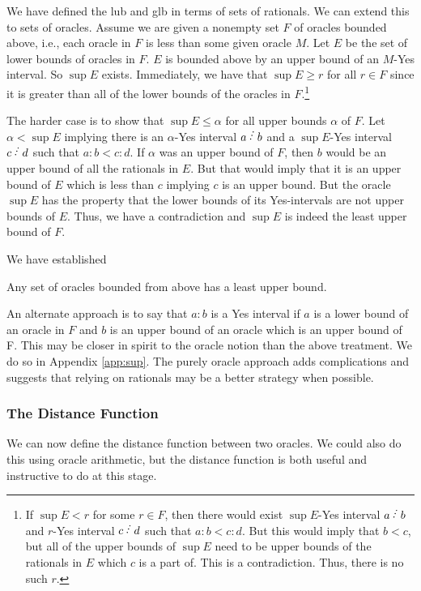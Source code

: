 \documentclass[12pt]{article}
\begin{document}
We have defined the lub and glb in terms of sets of rationals. We can extend this to sets of oracles. Assume we are given a nonempty set $F$ of oracles bounded above, i.e., each oracle in $F$ is less than some given oracle $M$. Let $E$ be the set of lower bounds of oracles in $F$. $E$ is bounded above by an upper bound of an $M$-Yes interval. So $\sup E$ exists. Immediately, we have that $\sup E \geq r$ for all $r \in F$ since it is greater than all of the lower bounds of the oracles in $F$.\footnote{If $\sup E < r$ for some $r \in F$, then there would exist $\sup E$-Yes interval $a \lte b$ and $r$-Yes interval $c\lte d$ such that $a:b < c:d$. But this would imply that $b < c$, but all of the upper bounds of $\sup E$ need to be upper bounds of the rationals in $E$ which $c$ is a part of. This is a contradiction. Thus, there is no such $r$.}

The harder case is to show that $\sup E \leq \alpha$ for all upper bounds $\alpha$ of $F$. Let $\alpha < \sup E$ implying there is an $\alpha$-Yes interval $a\lte b$ and a $\sup E$-Yes interval $c\lte d$ such that $a:b < c:d$. If $\alpha$ was an upper bound of $F$, then $b$ would be an upper bound of all the rationals in $E$. But that would imply that it is an upper bound of $E$ which is less than $c$ implying $c$ is an upper bound. But the oracle $\sup E$ has the property that the lower bounds of its Yes-intervals are not upper bounds of $E$. Thus, we have a contradiction and $\sup E$ is indeed the least upper bound of $F$.

We have established

\begin{theorem}\label{th:lub}
Any set of oracles bounded from above has a least upper bound. 
\end{theorem}

An alternate approach is to say that $a:b$ is a Yes interval if $a$ is a lower bound of an oracle in $F$ and $b$ is an upper bound of an oracle which is an upper bound of F. This may be closer in spirit to the oracle notion than the above treatment. We do so in Appendix \ref{app:sup}. The purely oracle approach adds complications and suggests that relying on rationals may be a better strategy when possible. 

\subsubsection{The Distance Function}

We can now define the distance function between two oracles. We could also do this using oracle arithmetic, but the distance function is both useful and instructive to do at this stage. 
\end{document}
